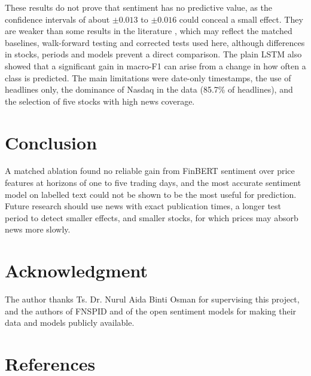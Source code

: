 \documentclass[a4paper,11pt]{article}
\begin{document}
These results do not prove that sentiment has no predictive value, as the confidence intervals of about $\pm 0.013$ to $\pm 0.016$ could conceal a small effect. They are weaker than some results in the literature \cite{gu2024predicting,dong2024fnspid}, which may reflect the matched baselines, walk-forward testing and corrected tests used here, although differences in stocks, periods and models prevent a direct comparison. The plain LSTM also showed that a significant gain in macro-F1 can arise from a change in how often a class is predicted. The main limitations were date-only timestamps, the use of headlines only, the dominance of Nasdaq in the data (85.7\% of headlines), and the selection of five stocks with high news coverage.

\section{Conclusion}
A matched ablation found no reliable gain from FinBERT sentiment over price features at horizons of one to five trading days, and the most accurate sentiment model on labelled text could not be shown to be the most useful for prediction. Future research should use news with exact publication times, a longer test period to detect smaller effects, and smaller stocks, for which prices may absorb news more slowly.

\section{Acknowledgment}
The author thanks Ts. Dr. Nurul Aida Binti Osman for supervising this project, and the authors of FNSPID and of the open sentiment models for making their data and models publicly available.

\section{References}
{\singlespacing
\printbibliography[heading=none]
\par}
\end{document}
